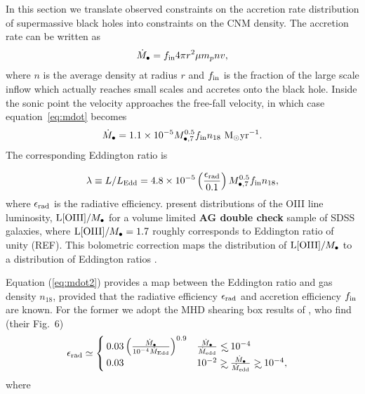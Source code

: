 \documentclass[usenatbib,fleqn]{mnras}
\newcommand\lsim{\mathrel{\rlap{\lower4pt\hbox{\hskip1pt$\sim$}}
    \raise1pt\hbox{$<$}}}
\newcommand\gsim{\mathrel{\rlap{\lower4pt\hbox{\hskip1pt$\sim$}}
    \raise1pt\hbox{$>$}}}
\newcommand{\Mbh}[1][]{M_{\bullet#1}}
\newcommand{\Msun}{{\rm M_\odot}}
\begin{document}
In this section we translate observed constraints on the accretion rate distribution of supermassive black holes into constraints on the CNM density.  The accretion rate can be written as
\begin{equation}
\dot{M}_{\bullet} = f_{\rm in} 4 \pi r^2 \mu m_p n v,
\label{eq:mdot}
\end{equation}
where $n$ is the average density at radius $r$ and $f_{\rm in}$
is the fraction of the large scale inflow which actually reaches small scales and accretes onto the black hole. 
Inside the sonic point the velocity approaches the free-fall velocity, in which case  equation~\eqref{eq:mdot} becomes
\begin{equation}
  \dot{M}_{\bullet} = 1.1\times 10^{-5} \Mbh[,7]^{0.5} f_{\rm in}
  n_{18} \,\,\Msun {\rm yr}^{-1}.
\label{eq:mdot2}
\end{equation}
%
The corresponding Eddington ratio is

\begin{equation}
  \lambda\equiv L/L_{\rm Edd} = 4.8 \times 10^{-5}
  \left(\frac{\epsilon_{\rm rad}}{0.1}\right) \Mbh[,7]^{0.5} f_{\rm in}
  n_{18},
\label{eq:n18Edd}
\end{equation}
%
where $\epsilon_{\rm rad}$ is the radiative efficiency. \citet{Kauffmann&Heckman2009} present distributions of the OIII line luminosity, ${\rm L[OIII]}/\Mbh$ for a volume limited {\bf
  AG double check} sample of SDSS galaxies, where ${\rm L[OIII]}/\Mbh=1.7$ roughly
corresponds to Eddington ratio of unity (REF).  This bolometric correction maps the distribution of ${\rm L[OIII]}/\Mbh$ to a distribution of Eddington ratios \citep{Kauffmann&Heckman2009}.

Equation (\ref{eq:mdot2}) provides a map between the Eddington ratio and gas density $n_{18}$, provided that the radiative efficiency $\epsilon_{\rm rad}$ and accretion efficiency $f_{\rm in}$  are known.  For the former we adopt the MHD shearing box results of \citet{Sharma+2007}, who find (their Fig.~6)
\begin{align}
&\epsilon_{\rm rad} \simeq 
\begin{cases}
  0.03 \left(\frac{\dot{M}_{\bullet}}{10^{-4}\dot{M}_{\rm Edd}}\right)^{0.9} & \frac{\dot{M}_{\bullet}}{\dot{M}_{\rm edd}} \lsim 10^{-4} \\
 0.03 &  10^{-2} \gsim \frac{\dot{M}_{\bullet}}{\dot{M}_{\rm edd}}
 \gsim  10^{-4},
\end{cases}
\label{eq:efficiency}
\end{align}
where
\end{document}

